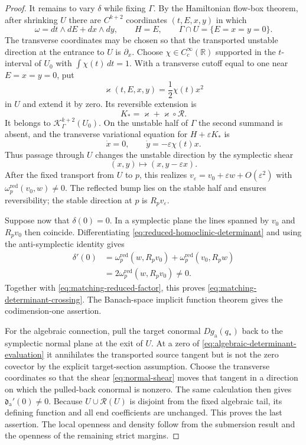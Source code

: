 \documentclass[11pt]{amsart}
\numberwithin{equation}{section}
\theoremstyle{definition}
\theoremstyle{remark}
\begin{document}
\begin{proof}
It remains to vary $\delta$ while fixing $\Gamma$.  By the Hamiltonian
flow-box theorem, after shrinking $U$ there are $C^{k+2}$ coordinates
$(t,E,x,y)$ in which
\[
 \omega=dt\wedge dE+dx\wedge dy,\qquad
 H=E,\qquad
 \Gamma\cap U=\{E=x=y=0\}.
\]
The transverse coordinates may be chosen so that the transported unstable
direction at the entrance to $U$ is $\partial_x$.  Choose
$\chi\in C_c^\infty(\mathbb R)$ supported in the $t$-interval of $U_0$
with $\int\chi(t)\,dt=1$.  With a transverse cutoff equal to one near
$E=x=y=0$, put
\[
 \varkappa(t,E,x,y)=\frac12\chi(t)x^2
\]
in $U$ and extend it by zero.  Its reversible extension is
\begin{equation}\label{eq:reversible-quadratic-shear}
 K_*=\varkappa+\varkappa\circ\mathcal R.
\end{equation}
It belongs to $\mathcal K_\Gamma^{k+2}(U_0)$.  On the unstable half of
$\Gamma$ the second summand is absent, and the transverse variational
equation for $H+\varepsilon K_*$ is
\[
 \dot x=0,\qquad \dot y=-\varepsilon\chi(t)x.
\]
Thus passage through $U$ changes the unstable direction by the
symplectic shear
\begin{equation}\label{eq:normal-shear}
 (x,y)\longmapsto(x,y-\varepsilon x).
\end{equation}
After the fixed transport from $U$ to $p$, this realizes
$v_\varepsilon=v_0+\varepsilon w+O(\varepsilon^2)$ with
$\omega_p^{\mathrm{red}}(v_0,w)\ne0$.  The reflected bump lies on the
stable half and ensures reversibility; the stable direction at $p$ is
$R_pv_\varepsilon$.

Suppose now that $\delta(0)=0$.  In a symplectic plane the lines spanned
by $v_0$ and $R_pv_0$ then coincide.  Differentiating
\eqref{eq:reduced-homoclinic-determinant} and using the anti-symplectic
identity gives
\begin{align*}
 \delta'(0)
 &=\omega_p^{\mathrm{red}}(w,R_pv_0)
   +\omega_p^{\mathrm{red}}(v_0,R_pw)\\
 &=2\omega_p^{\mathrm{red}}(w,R_pv_0)\ne0.
\end{align*}
Together with \eqref{eq:matching-reduced-factor}, this proves
\eqref{eq:matching-determinant-crossing}.  The Banach-space implicit
function theorem gives the codimension-one assertion.

For the algebraic connection, pull the target conormal
$Dg_{\mathrm a}(q_*)$ back to the symplectic normal plane at the exit of
$U$.  At a zero of
\eqref{eq:algebraic-determinant-evaluation} it annihilates the transported
source tangent but is not the zero covector by the explicit target-section
assumption.  Choose the transverse
coordinates so that the shear \eqref{eq:normal-shear} moves that tangent
in a direction on which the pulled-back conormal is nonzero.  The same
calculation then gives $\mathfrak d_{\mathrm a}'(0)\ne0$.  Because
$U\cup\mathcal R(U)$ is disjoint from the fixed algebraic tail, its
defining function and all end coefficients are unchanged.  This proves
the last assertion.  The local openness and density follow from the
submersion result and the openness of the remaining strict margins.
\end{proof}
\end{document}
